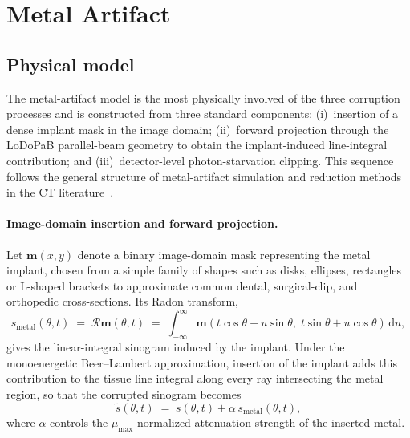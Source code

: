 \section{Metal Artifact}
\label{sec:meth_metal}

\subsection{Physical model}

The metal-artifact model is the most physically involved of the three corruption processes and is constructed from three standard components: (i)~insertion of a dense implant mask in the image domain; (ii)~forward projection through the LoDoPaB parallel-beam geometry to obtain the implant-induced line-integral contribution; and (iii)~detector-level photon-starvation clipping. This sequence follows the general structure of metal-artifact simulation and reduction methods in the CT literature~\cite{Gjesteby2016, Boas2012, ZhangYu2018}.

\paragraph{Image-domain insertion and forward projection.}
Let $\mathbf{m}(x,y)$ denote a binary image-domain mask representing the metal implant, chosen from a simple family of shapes such as disks, ellipses, rectangles or L-shaped brackets to approximate common dental, surgical-clip, and orthopedic cross-sections. Its Radon transform,
\begin{equation}
    s_\mathrm{metal}(\theta,t)
    \;=\; \mathcal{R}\mathbf{m}(\theta,t)
    \;=\; \int_{-\infty}^{\infty}
        \mathbf{m}(t\cos\theta - u\sin\theta,\; t\sin\theta + u\cos\theta)\,\mathrm{d}u,
    \label{eq:meth_metal_fp}
\end{equation}
gives the linear-integral sinogram induced by the implant. Under the monoenergetic Beer--Lambert approximation, insertion of the implant adds this contribution to the tissue line integral along every ray intersecting the metal region, so that the corrupted sinogram becomes
\begin{equation}
    \tilde{s}(\theta,t) \;=\; s(\theta,t) + \alpha\, s_\mathrm{metal}(\theta,t),
    \label{eq:meth_metal_additive}
\end{equation}
where $\alpha$ controls the $\mu_{\max}$-normalized attenuation strength of the inserted metal.

